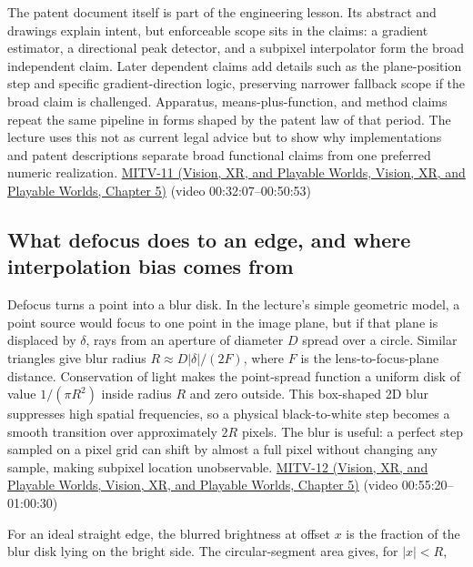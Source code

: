 The patent document itself is part of the engineering lesson. Its abstract and drawings explain intent, but enforceable scope sits in the claims: a gradient estimator, a directional peak detector, and a subpixel interpolator form the broad independent claim. Later dependent claims add details such as the plane-position step and specific gradient-direction logic, preserving narrower fallback scope if the broad claim is challenged. Apparatus, means-plus-function, and method claims repeat the same pipeline in forms shaped by the patent law of that period. The lecture uses this not as current legal advice but to show why implementations and patent descriptions separate broad functional claims from one preferred numeric realization. \href{../07-Vision-XR-and-Playable-Worlds/main.pdf\#nameddest=04-visual-computing-ii-ch036-mitv-11---edge-detection-subpixel-position-cordic-line-detection-us-6408109}{MITV-11 (Vision, XR, and Playable Worlds, Vision, XR, and Playable Worlds, Chapter 5)} (video 00:32:07--00:50:53)

\subsection{What defocus does to an edge, and where interpolation bias comes from}\label{04-visual-computing-ii-ch030-what-defocus-does-to-an-edge-and-where-interpolation-bias-comes-from}

Defocus turns a point into a blur disk. In the lecture's simple geometric model, a point source would focus to one point in the image plane, but if that plane is displaced by \(\delta\), rays from an aperture of diameter \(D\) spread over a circle. Similar triangles give blur radius \(R\approx D|\delta|/(2F)\), where \(F\) is the lens-to-focus-plane distance. Conservation of light makes the point-spread function a uniform disk of value \(1/(\pi R^2)\) inside radius \(R\) and zero outside. This box-shaped 2D blur suppresses high spatial frequencies, so a physical black-to-white step becomes a smooth transition over approximately \(2R\) pixels. The blur is useful: a perfect step sampled on a pixel grid can shift by almost a full pixel without changing any sample, making subpixel location unobservable. \href{../07-Vision-XR-and-Playable-Worlds/main.pdf\#nameddest=04-visual-computing-ii-ch036-mitv-12---blob-analysis-binary-image-processing-greens-theorem-derivative-and-integral}{MITV-12 (Vision, XR, and Playable Worlds, Vision, XR, and Playable Worlds, Chapter 5)} (video 00:55:20--01:00:30)

For an ideal straight edge, the blurred brightness at offset \(x\) is the fraction of the blur disk lying on the bright side. The circular-segment area gives, for \(|x|<R\),

